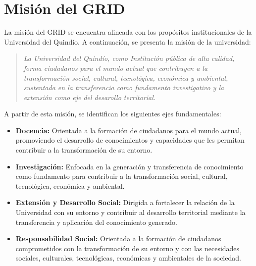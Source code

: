 \section{Misión del \texorpdfstring{\ac{GRID}}{GRID}}

La misión del \ac{GRID} se encuentra alineada con los propósitos institucionales de la Universidad del Quindío. A continuación, se presenta la misión de la universidad:

\begin{quote}
	\textit{La Universidad del Quindío, como Institución pública de alta calidad, forma ciudadanos para el mundo actual que contribuyen a la transformación social, cultural, tecnológica, económica y ambiental, sustentada en la transferencia como fundamento investigativo y la extensión como eje del desarollo territorial. \citep{uniquindio2026}}
\end{quote}

A partir de esta misión, se identifican los siguientes ejes fundamentales:

\begin{itemize}
	\item \textbf{Docencia:} Orientada a la formación de ciudadanos para el mundo actual, promoviendo el desarrollo de conocimientos y capacidades que les permitan contribuir a la transformación de su entorno.

	\item \textbf{Investigación:} Enfocada en la generación y transferencia de conocimiento como fundamento para contribuir a la transformación social, cultural, tecnológica, económica y ambiental.

	\item \textbf{Extensión y Desarrollo Social:} Dirigida a fortalecer la relación de la Universidad con su entorno y contribuir al desarrollo territorial mediante la transferencia y aplicación del conocimiento generado.

	\item \textbf{Responsabilidad Social:} Orientada a la formación de ciudadanos comprometidos con la transformación de su entorno y con las necesidades sociales, culturales, tecnológicas, económicas y ambientales de la sociedad.
\end{itemize}
